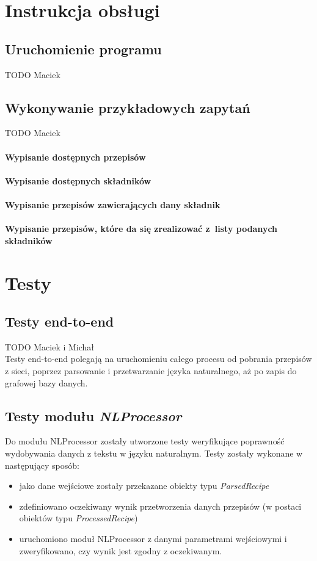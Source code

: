 \documentclass[11pt,a4paper]{article}
\begin{document}
\newpage
\section{Instrukcja obsługi}
\subsection{Uruchomienie programu}
TODO Maciek

\subsection{Wykonywanie przykładowych zapytań}
TODO Maciek
\paragraph{Wypisanie dostępnych przepisów}
\paragraph{Wypisanie dostępnych składników}
\paragraph{Wypisanie przepisów zawierających dany składnik}
\paragraph{Wypisanie przepisów, które da się zrealizować z~listy podanych składników}

\newpage
\section{Testy}
\subsection{Testy end-to-end}
TODO Maciek i Michał\\
Testy end-to-end polegają na uruchomieniu całego procesu od pobrania przepisów z sieci, poprzez parsowanie i przetwarzanie języka naturalnego, aż po zapis do grafowej bazy danych.

\subsection{Testy modułu \textit{NLProcessor}}
Do modułu NLProcessor zostały utworzone testy weryfikujące poprawność wydobywania danych z tekstu w języku naturalnym. Testy zostały wykonane w następujący sposób:
\begin{itemize}
\item jako dane wejściowe zostały przekazane obiekty typu \textit{ParsedRecipe} 
\item zdefiniowano oczekiwany wynik przetworzenia danych przepisów (w postaci obiektów typu \textit{ProcessedRecipe})
\item uruchomiono moduł NLProcessor z danymi parametrami wejściowymi i zweryfikowano, czy wynik jest zgodny z oczekiwanym.  
\end{itemize}
\end{document}
